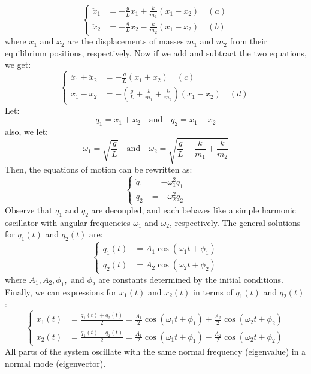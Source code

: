 \documentclass[11pt]{report}
\begin{document}
\begin{definition}
    $$
        \begin{cases}
            \ddot{x}_1 &= -\frac{g}{L}x_1 + \frac{k}{m_1} (x_1 - x_2) \quad (a) \\
            \ddot{x}_2 &= -\frac{g}{L}x_2 - \frac{k}{m_2} (x_1 - x_2) \quad (b)
        \end{cases}
    $$
    where \( x_1 \) and \( x_2 \) are the displacements of masses \( m_1 \) and \( m_2 \) from their equilibrium positions, respectively. Now if we add and subtract the two equations, we get:
    $$
        \begin{cases}
            \ddot{x}_1 + \ddot{x}_2 &= -\frac{g}{L}(x_1 + x_2) \quad (c) \\
            \ddot{x}_1 - \ddot{x}_2 &= -\left(\frac{g}{L} + \frac{k}{m_1} + \frac{k}{m_2}\right)(x_1 - x_2) \quad (d)
        \end{cases}
    $$
    Let:
    $$ 
    q_1 = x_1 + x_2 \quad \text{and} \quad q_2 = x_1 - x_2
    $$
    also, we let:
    $$
        \omega_1 = \sqrt{\frac{g}{L}} \quad \text{and} \quad \omega_2 = \sqrt{\frac{g}{L} + \frac{k}{m_1} + \frac{k}{m_2}}
    $$
    Then, the equations of motion can be rewritten as:
    $$
        \begin{cases}
            \ddot{q}_1 &= -\omega_1^2 q_1 \\
            \ddot{q}_2 &= -\omega_2^2 q_2
        \end{cases}
    $$
    Observe that \( q_1 \) and \( q_2 \) are decoupled, and each behaves like a simple harmonic oscillator with angular frequencies \( \omega_1 \) and \( \omega_2 \), respectively. The general solutions for \( q_1(t) \) and \( q_2(t) \) are:
    $$
        \begin{cases}
            q_1(t) &= A_1 \cos(\omega_1 t + \phi_1) \\
            q_2(t) &= A_2 \cos(\omega_2 t + \phi_2)
        \end{cases}
    $$
    where \( A_1, A_2, \phi_1, \) and \( \phi_2 \) are constants determined by the initial conditions. Finally, we can expressions for \( x_1(t) \) and \( x_2(t) \) in terms of \( q_1(t) \) and \( q_2(t) \):
    $$
        \begin{cases}
            x_1(t) &= \frac{q_1(t) + q_2(t)}{2} = \frac{A_1}{2} \cos(\omega_1 t + \phi_1) + \frac{A_2}{2} \cos(\omega_2 t + \phi_2) \\
            x_2(t) &= \frac{q_1(t) - q_2(t)}{2} = \frac{A_1}{2} \cos(\omega_1 t + \phi_1) - \frac{A_2}{2} \cos(\omega_2 t + \phi_2)
        \end{cases}
    $$
    All parts of the system oscillate with the same normal frequency (eigenvalue) in a normal mode (eigenvector).
\end{definition}
\end{document}
